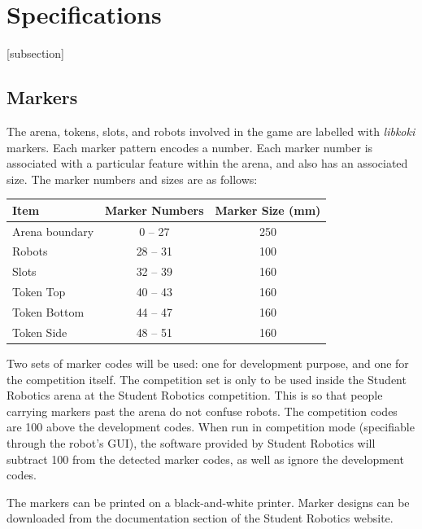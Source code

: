 \section{Specifications}
\label{sec:Specifications}

[subsection]
\newcommand{\rcnii}{\stepcounter{rulei}\arabic{section}.\arabic{subsection}.\arabic{rulei}}
\renewcommand{\labelenumi}{\rcnii}

\subsection{Markers}
\label{sub:markers}
The arena, tokens, slots, and robots involved in the game are labelled with \textit{libkoki} markers.
Each marker pattern encodes a number.
Each marker number is associated with a particular feature within the arena, and also has an associated size.
The marker numbers and sizes are as follows:

\begin{center}
  \begin{tabular}{lcc}
    \toprule
    \textbf{Item} & \textbf{Marker Numbers} & \textbf{Marker Size (mm)} \\
    \midrule
    Arena boundary & {} 0 -- 27 & 250 \\
    Robots & 28 -- 31 & 100 \\
    Slots & 32 -- 39 & 160 \\
    Token Top & 40 -- 43 & 160 \\
    Token Bottom & 44 -- 47 & 160 \\
    Token Side & 48 -- 51 & 160 \\
    \bottomrule
  \end{tabular}
\end{center}

Two sets of marker codes will be used: one for development purpose, and one for the competition itself.
The competition set is only to be used inside the Student Robotics arena at the Student Robotics competition.
This is so that people carrying markers past the arena do not confuse robots.
The competition codes are 100 above the development codes.
When run in competition mode (specifiable through the robot's GUI), the software provided by Student Robotics will subtract 100 from the detected marker codes, as well as ignore the development codes.

The markers can be printed on a black-and-white printer.
Marker designs can be downloaded from the documentation section of the Student Robotics website.

